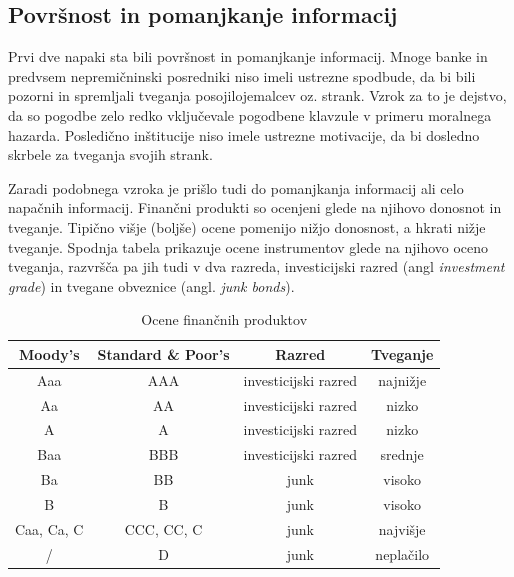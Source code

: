 \documentclass[12pt,a4paper]{amsart}
\theoremstyle{definition} %
\theoremstyle{plain} %
\begin{document}
\subsection{Površnost in pomanjkanje informacij}
Prvi dve napaki sta bili površnost in pomanjkanje informacij. Mnoge banke in predvsem 
nepremičninski posredniki niso imeli ustrezne spodbude, da bi bili pozorni in spremljali 
tveganja posojilojemalcev oz. strank. Vzrok za to je dejstvo, da so pogodbe zelo redko 
vključevale pogodbene klavzule v primeru moralnega hazarda. Posledično 
inštitucije niso imele ustrezne motivacije, da bi dosledno skrbele za tveganja svojih 
strank.

Zaradi podobnega vzroka je prišlo tudi do pomanjkanja informacij ali celo napačnih 
informacij. Finančni produkti so ocenjeni glede na njihovo donosnot in tveganje. 
Tipično višje (boljše) ocene pomenijo nižjo donosnost, a hkrati nižje tveganje. 
Spodnja tabela prikazuje ocene instrumentov glede na njihovo oceno tveganja, 	
razvršča pa jih tudi v dva razreda, investicijski razred (angl \textit{investment 
grade}) in tvegane obveznice (angl. \textit{junk bonds}).

\begin{table}[h]
\begin{tabular}{c|c|c|c}
\textbf{Moody's} & \textbf{Standard \& Poor's} & \textbf{Razred}      & \textbf{Tveganje} \\ \hline
Aaa              & AAA                         & investicijski razred & najnižje          \\
Aa               & AA                          & investicijski razred & nizko             \\
A                & A                           & investicijski razred & nizko             \\
Baa              & BBB                         & investicijski razred & srednje           \\
Ba               & BB                          & junk                 & visoko            \\
B                & B                           & junk                 & visoko            \\
Caa, Ca, C       & CCC, CC, C                  & junk                 & najvišje          \\
/                & D                           & junk                 & neplačilo        
\end{tabular}
\caption{\label{ocene}Ocene finančnih produktov}
\end{table}
\end{document}

